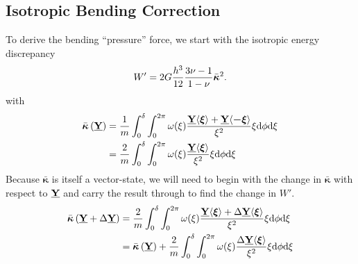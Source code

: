 \documentclass[preprint,review,12pt]{elsarticle}
\newcommand\vstate[3]{%
	\mathbf{\underline{#1}}%
	\ifstrempty{#2}{}{[#2]}%
	\ifstrempty{#3}{}{\langle #3 \rangle}}
\begin{document}
\subsection{Isotropic Bending Correction}
To derive the bending ``pressure'' force, we start with the isotropic energy discrepancy
%
\begin{equation}
    W'=2G\frac{h^3}{12}\frac{3\nu-1}{1-\nu}\bar{\boldsymbol{\kappa}}^2. \notag
\end{equation}
%
with
%
\begin{align}
    \bar{\boldsymbol{\kappa}}\left(\vstate{Y}{}{}\right) &= \frac{1}{m} \int_0^\delta \int_0^{2\pi}\omega(\xi)\frac{\vstate{Y}{}{\boldsymbol{\xi}}+\vstate{Y}{}{\boldsymbol{-\xi}}}{\xi^2} \xi {\rm d}\phi {\rm d}\xi \notag \\
    &= \frac{2}{m} \int_0^\delta \int_0^{2\pi}\omega(\xi)\frac{\vstate{Y}{}{\boldsymbol{\xi}}}{\xi^2} \xi {\rm d}\phi {\rm d}\xi \notag
\end{align}
Because $\bar{\boldsymbol{\kappa}}$ is itself a vector-state, we will need to begin with the change in $\bar{\boldsymbol{\kappa}}$ with respect to $\vstate{Y}{}{}$ and carry the result through to find the change in $W'$.
\begin{align}
    \bar{\boldsymbol{\kappa}}\left(\vstate{Y}{}{}+\Delta\vstate{Y}{}{}\right) &= \frac{2}{m} \int_0^\delta \int_0^{2\pi}\omega(\xi)\frac{\vstate{Y}{}{\boldsymbol{\xi}}+\Delta\vstate{Y}{}{\boldsymbol{\xi}}}{\xi^2} \xi {\rm d}\phi {\rm d}\xi \notag \\
    &= \bar{\boldsymbol{\kappa}}\left(\vstate{Y}{}{}\right) + \frac{2}{m} \int_0^\delta \int_0^{2\pi}\omega(\xi)\frac{\Delta\vstate{Y}{}{\boldsymbol{\xi}}}{\xi^2} \xi {\rm d}\phi {\rm d}\xi \notag 
\end{align}
%
%
\end{document}
